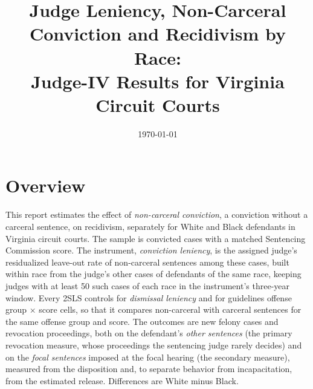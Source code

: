 \documentclass[11pt]{article}
\title{Judge Leniency, Non-Carceral Conviction and Recidivism by Race:\\ Judge-IV Results for Virginia Circuit Courts}
\date{\today}
\begin{document}
\maketitle

\section{Overview}

This report estimates the effect of \emph{non-carceral conviction}, a conviction without a carceral sentence, on recidivism, separately for White and Black defendants in Virginia circuit courts. The sample is convicted cases with a matched Sentencing Commission score. The instrument, \emph{conviction leniency}, is the assigned judge's residualized leave-out rate of non-carceral sentences among these cases, built within race from the judge's other cases of defendants of the same race, keeping judges with at least 50 such cases of each race in the instrument's three-year window. Every 2SLS controls for \emph{dismissal leniency} and for guidelines offense group $\times$ score cells, so that it compares non-carceral with carceral sentences for the same offense group and score. The outcomes are new felony cases and revocation proceedings, both on the defendant's \emph{other sentences} (the primary revocation measure, whose proceedings the sentencing judge rarely decides) and on the \emph{focal sentences} imposed at the focal hearing (the secondary measure), measured from the disposition and, to separate behavior from incapacitation, from the estimated release. Differences are White minus Black.
\end{document}
